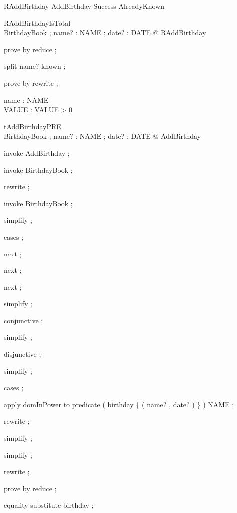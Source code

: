 \begin{zed}RAddBirthday  AddBirthday \land Success \lor AlreadyKnown
\end{zed}



\begin{theorem}{ RAddBirthdayIsTotal}\\
 \forall BirthdayBook ; name? : NAME ; date? : DATE @ \pre RAddBirthday \\

\end{theorem}



\begin{zproof}[RAddBirthdayIsTotal]

 prove by reduce ;
 
 split name? \in known ;
 
 prove by rewrite ;
 

\end{zproof}



\begin{axdef}name : NAME \\
 VALUE : \nat 
\where
 VALUE > 0
\end{axdef}



\begin{theorem}{ tAddBirthdayPRE}\\
 \forall BirthdayBook ; name? : NAME ; date? : DATE @ \pre AddBirthday \\

\end{theorem}



\begin{zproof}[tAddBirthdayPRE]

 invoke AddBirthday ;
 
 invoke \Delta BirthdayBook ;
 
 rewrite ;
 
 invoke BirthdayBook ;
 
 simplify ;
 
 cases ;
 
 next ;
 
 next ;
 
 next ;
 
 simplify ;
 
 conjunctive ;
 
 simplify ;
 
 disjunctive ;
 
 simplify ;
 
 cases ;
 
 apply domInPower to predicate \dom ( birthday \cup \{ ( name? , date? ) \} ) \in \power NAME ;
 
 rewrite ;
 
 simplify ;
 
 simplify ;
 
 rewrite ;
 
 prove by reduce ;
 
 equality substitute \dom birthday ;
 

\end{zproof}



